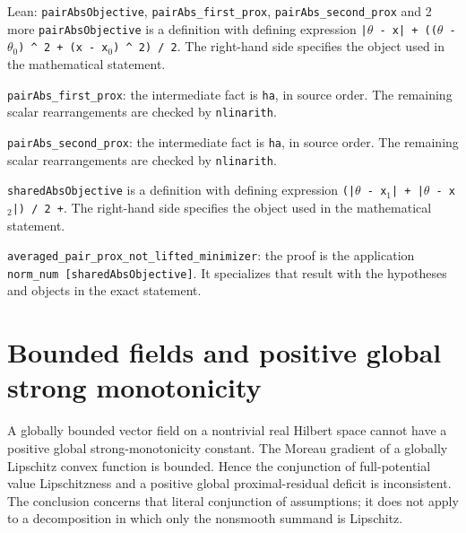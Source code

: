 \documentclass[11pt,a4paper]{report}
\begin{document}
\begin{leanbox}{Lean: \texttt{pairAbsObjective}, \texttt{pairAbs\_\allowbreak{}first\_\allowbreak{}prox}, \texttt{pairAbs\_\allowbreak{}second\_\allowbreak{}prox} and 2 more}
\texttt{pair\allowbreak{}Abs\allowbreak{}Objective} is a definition with defining expression \texttt{|\ensuremath{\theta} -\allowbreak{} x| + ((\ensuremath{\theta} -\allowbreak{} \ensuremath{\theta}\ensuremath{{}_{0}}) \textasciicircum{} 2 + (x -\allowbreak{} x\ensuremath{{}_{0}}) \textasciicircum{} 2) /\allowbreak{} 2}. The right-hand side specifies the object used in the mathematical statement.



\texttt{pair\allowbreak{}Abs\_\allowbreak{}first\_\allowbreak{}prox}: the intermediate fact is \texttt{ha}, in source order. The remaining scalar rearrangements are checked by \texttt{nlinarith}.



\texttt{pair\allowbreak{}Abs\_\allowbreak{}second\_\allowbreak{}prox}: the intermediate fact is \texttt{ha}, in source order. The remaining scalar rearrangements are checked by \texttt{nlinarith}.



\texttt{shared\allowbreak{}Abs\allowbreak{}Objective} is a definition with defining expression \texttt{(|\ensuremath{\theta} -\allowbreak{} x\ensuremath{{}_{1}}| + |\ensuremath{\theta} -\allowbreak{} x\ensuremath{{}_{2}}|) /\allowbreak{} 2 +}. The right-hand side specifies the object used in the mathematical statement.



\texttt{averaged\_\allowbreak{}pair\_\allowbreak{}prox\_\allowbreak{}not\_\allowbreak{}lifted\_\allowbreak{}minimizer}: the proof is the application \texttt{norm\_\allowbreak{}num [shared\allowbreak{}Abs\allowbreak{}Objective]}. It specializes that result with the hypotheses and objects in the exact statement.
\end{leanbox}
\section{\texorpdfstring{Bounded fields and positive global strong monotonicity}{Bounded fields and positive global strong monotonicity}}
\label{proof-module-ProximalLangevin-PIPULAConsistency-lean}


A globally bounded vector field on a nontrivial real Hilbert space cannot have a positive global strong-monotonicity constant. The Moreau gradient of a globally Lipschitz convex function is bounded. Hence the conjunction of full-potential value Lipschitzness and a positive global proximal-residual deficit is inconsistent. The conclusion concerns that literal conjunction of assumptions; it does not apply to a decomposition in which only the nonsmooth summand is Lipschitz.
\end{document}
